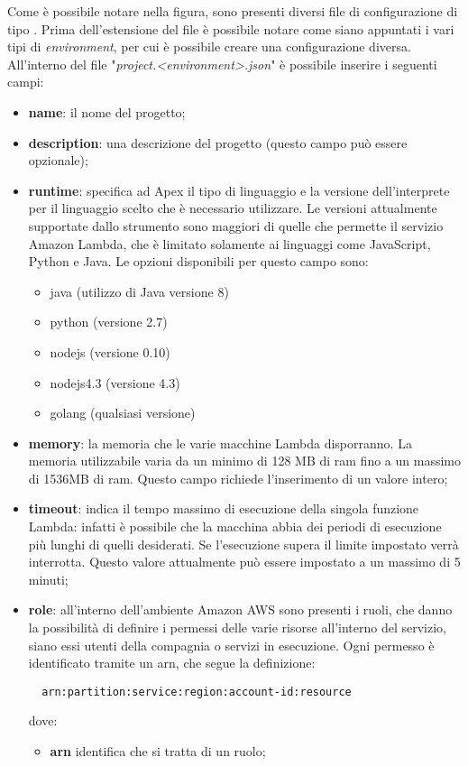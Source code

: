 Come è possibile notare nella figura, sono presenti diversi file di
configurazione di tipo . Prima
dell'estensione del file è possibile notare come siano appuntati i vari tipi di
\textit{environment}, per cui è possibile creare una configurazione diversa.
All'interno del file "\textit{project.<environment>.json}" è possibile inserire
i seguenti campi:
\begin{itemize}
  \item \textbf{name}: il nome del progetto;
  \item \textbf{description}: una descrizione del progetto (questo campo può
essere opzionale);
  \item \textbf{runtime}: specifica ad Apex il tipo di linguaggio e la versione
dell'interprete per il linguaggio scelto che è necessario utilizzare. Le
versioni attualmente supportate dallo strumento sono maggiori di quelle che
permette il servizio Amazon Lambda, che è limitato solamente ai linguaggi come
JavaScript, Python e Java. Le opzioni disponibili per questo campo sono:
  \begin{itemize}
    \item java (utilizzo di Java versione 8)
    \item python (versione 2.7)
    \item nodejs (versione 0.10)
    \item nodejs4.3 (versione 4.3)
    \item golang (qualsiasi versione)
  \end{itemize}

  \item \textbf{memory}: la memoria che le varie macchine Lambda disporranno.
La memoria utilizzabile varia da un minimo di 128 MB di \gls{ram} fino a un
massimo di 1536MB di \gls{ram}. Questo campo richiede l'inserimento di un
valore intero;

  \item \textbf{timeout}: indica il tempo massimo di esecuzione della singola
funzione Lambda: infatti è possibile che la macchina abbia dei periodi di
esecuzione più lunghi di quelli desiderati. Se l'esecuzione supera il limite
impostato verrà interrotta. Questo valore attualmente può essere impostato a un
massimo di 5 minuti;

  \item \textbf{role}: all'interno dell'ambiente Amazon AWS sono presenti i
ruoli, che danno la possibilità di definire i permessi delle varie risorse
all'interno del servizio, siano essi utenti della compagnia o servizi in
esecuzione. Ogni permesso è identificato tramite un \gls{arn}, che segue la
definizione:
\begin{verbatim}
  arn:partition:service:region:account-id:resource
\end{verbatim}
dove:
  \begin{itemize}
    \item \textbf{arn} identifica che si tratta di un ruolo;


\end{itemize}
\end{itemize}
